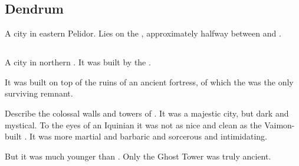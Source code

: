 \subsection{Dendrum}
A city in eastern Pelidor. 
Lies on the , approximately halfway between  and . 











\subsection{\Forclin}
A city in northern .
It was built by the . 

It was built on top of the ruins of an ancient \resphan{} fortress, of which the  was the only surviving remnant. 

Describe the colossal walls and towers of \Forclin.
It was a majestic city, but dark and mystical. 
To the eyes of an Iquinian it was not as nice and clean as the Vaimon-built \Malcur. 
It was more martial and barbaric and sorcerous and intimidating. 

But it was much younger than \Malcur. 
Only the Ghost Tower was truly ancient. 

